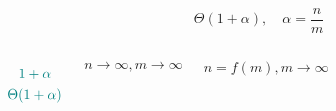 \begin{frame}{}
  \[
    \Theta(1 + \alpha), \quad \alpha = \frac{n}{m}
  \]

  \pause
  \vspace{0.30cm}
  \centerline{}

  \pause
  \begin{columns}
      \[
	\textcolor{teal}{1 + \alpha}
      \]
    \pause
      \[
	\textcolor{teal}{\Theta(1 + \alpha)}
      \]

      \[
	n \to \infty, m \to \infty
      \]

      \[
	n = f(m), m \to \infty
      \]
  \end{columns}
\end{frame}
